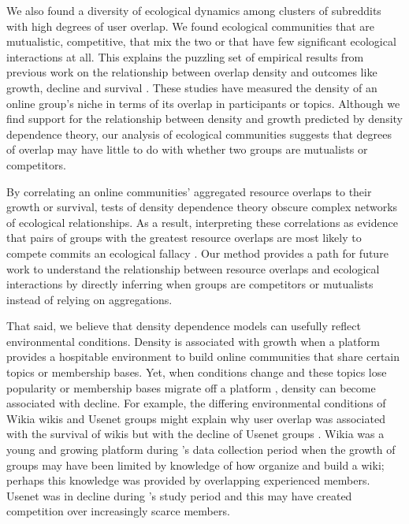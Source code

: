 \documentclass[letterpaper]{article}\usepackage[]{graphicx}\usepackage[]{color}
\def\citepos#1{{\citeauthor{#1}}'s}
\begin{document}
We also found a diversity of ecological dynamics among clusters of subreddits with high degrees of user overlap. We found ecological communities that are mutualistic, competitive, that mix the two or that have few significant ecological interactions at all. 
This explains the puzzling set of empirical results from previous work on the relationship between overlap density and outcomes like growth, decline and survival  \cite{wang_impact_2012, zhu_impact_2014, zhu_selecting_2014}.
These studies have measured the density of an online group's niche in terms of its overlap in participants or topics. 
Although we find support for the relationship between density and growth predicted by density dependence theory, our analysis of ecological communities suggests that degrees of overlap may have little to do with whether two groups are mutualists or competitors. 

By correlating an online communities' aggregated resource overlaps to their growth or survival, tests of density dependence theory obscure complex networks of ecological relationships.
As a result, interpreting these correlations as evidence that pairs of groups with the greatest resource overlaps are most likely to compete commits an ecological fallacy \citep{piantadosi_ecological_1988, robinson_ecological_1950}.  
Our method provides a path for future work to understand the relationship between resource overlaps and ecological interactions by directly inferring when groups are competitors or mutualists instead of relying on aggregations. 

That said, we believe that density dependence models can usefully reflect environmental conditions.  Density is associated with growth when a platform provides a hospitable environment to build online communities that share certain topics or membership bases. 
Yet, when conditions change and these topics lose popularity or membership bases migrate off a platform \cite{fiesler_moving_2020}, density can become associated with decline. 
For example, the differing environmental conditions of Wikia wikis and Usenet groups might explain why user overlap was associated with the survival of wikis \cite{zhu_impact_2014} but with the decline of Usenet groups \cite{wang_impact_2012}. Wikia was a young and growing platform during \citepos{zhu_impact_2014} data collection period when the growth of groups may have been limited by knowledge of how organize and build a wiki; perhaps this knowledge was provided by overlapping experienced members. 
Usenet was in decline during \citepos{wang_impact_2012} study period and this may have created competition over increasingly scarce members. 
\end{document}
